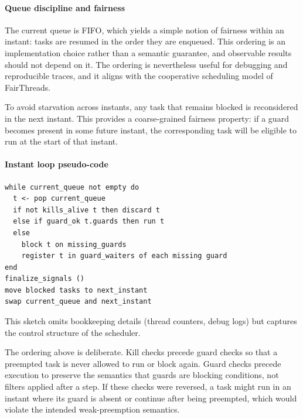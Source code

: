 \paragraph{Queue discipline and fairness}
The current queue is FIFO, which yields a simple notion of fairness within an
instant: tasks are resumed in the order they are enqueued. This ordering is an
implementation choice rather than a semantic guarantee, and observable results
should not depend on it. The ordering is nevertheless useful for debugging and
reproducible traces, and it aligns with the cooperative scheduling model of
FairThreads.

To avoid starvation across instants, any task that remains blocked is
reconsidered in the next instant. This provides a coarse-grained fairness
property: if a guard becomes present in some future instant, the corresponding
task will be eligible to run at the start of that instant.

\paragraph{Instant loop pseudo-code}
\begin{lstlisting}[style=tempo]
while current_queue not empty do
  t <- pop current_queue
  if not kills_alive t then discard t
  else if guard_ok t.guards then run t
  else
    block t on missing_guards
    register t in guard_waiters of each missing guard
end
finalize_signals ()
move blocked tasks to next_instant
swap current_queue and next_instant
\end{lstlisting}
This sketch omits bookkeeping details (thread counters, debug logs) but
captures the control structure of the scheduler.

The ordering above is deliberate. Kill checks precede guard checks so that a
preempted task is never allowed to run or block again. Guard checks precede
execution to preserve the semantics that guards are blocking conditions, not
filters applied after a step. If these checks were reversed, a task might run
in an instant where its guard is absent or continue after being preempted,
which would violate the intended weak-preemption semantics.

